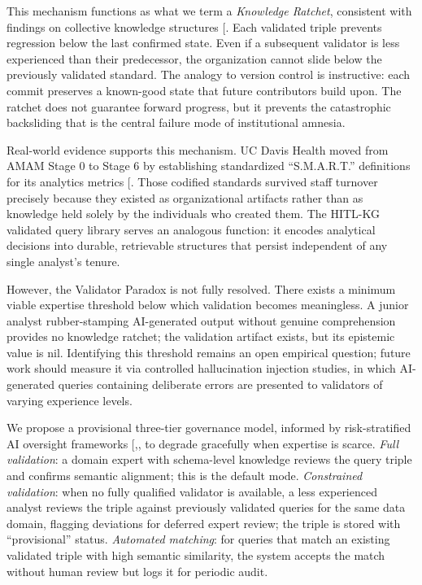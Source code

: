 \documentclass[
  american,
  11pt,
  letterpaper,
  oneside  ,captions=tableheading
]{scrartcl}
\begin{document}
This mechanism functions as what we term a \emph{Knowledge Ratchet},
consistent with findings on collective knowledge structures
{[}\citeproc{ref-rao2006}{11}{]}. Each validated triple prevents
regression below the last confirmed state. Even if a subsequent
validator is less experienced than their predecessor, the organization
cannot slide below the previously validated standard. The analogy to
version control is instructive: each commit preserves a known-good state
that future contributors build upon. The ratchet does not guarantee
forward progress, but it prevents the catastrophic backsliding that is
the central failure mode of institutional amnesia.

Real-world evidence supports this mechanism. UC Davis Health moved from
AMAM Stage 0 to Stage 6 by establishing standardized ``S.M.A.R.T.''
definitions for its analytics metrics
{[}\citeproc{ref-himss2025ucdavis}{73}{]}. Those codified standards
survived staff turnover precisely because they existed as organizational
artifacts rather than as knowledge held solely by the individuals who
created them. The HITL-KG validated query library serves an analogous
function: it encodes analytical decisions into durable, retrievable
structures that persist independent of any single analyst's tenure.

However, the Validator Paradox is not fully resolved. There exists a
minimum viable expertise threshold below which validation becomes
meaningless. A junior analyst rubber-stamping AI-generated output
without genuine comprehension provides no knowledge ratchet; the
validation artifact exists, but its epistemic value is nil. Identifying
this threshold remains an open empirical question; future work should
measure it via controlled hallucination injection studies, in which
AI-generated queries containing deliberate errors are presented to
validators of varying experience levels.

We propose a provisional three-tier governance model, informed by
risk-stratified AI oversight frameworks
{[},\citeproc{ref-labkoff2024}{75}{]},
to degrade gracefully when expertise is scarce. \emph{Full validation}:
a domain expert with schema-level knowledge reviews the query triple and
confirms semantic alignment; this is the default mode. \emph{Constrained
validation}: when no fully qualified validator is available, a less
experienced analyst reviews the triple against previously validated
queries for the same data domain, flagging deviations for deferred
expert review; the triple is stored with ``provisional'' status.
\emph{Automated matching}: for queries that match an existing validated
triple with high semantic similarity, the system accepts the match
without human review but logs it for periodic audit.
\end{document}
